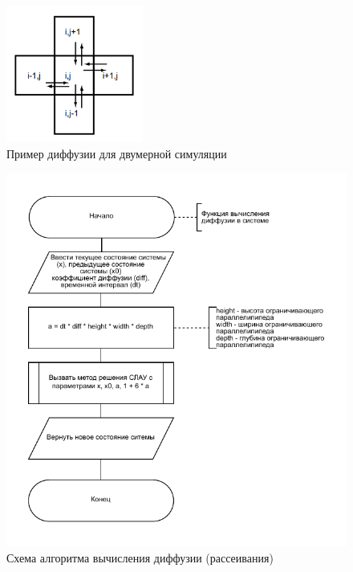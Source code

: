 \begin{figure}[H]
	\centering
	\includegraphics[width=0.4\textwidth, page=1]{assets/img/diffusion.png}   
	\caption{Пример диффузии для двумерной симуляции}
	\label{fig:diffusion}
\end{figure}

\begin{figure}[H]
	\centering
	\includegraphics[width=1.0\textwidth,page=1]{assets/img/diffuse.pdf}
	\caption{Схема алгоритма вычисления диффузии (рассеивания)}
	\label{fig:diffuse}
\end{figure}

